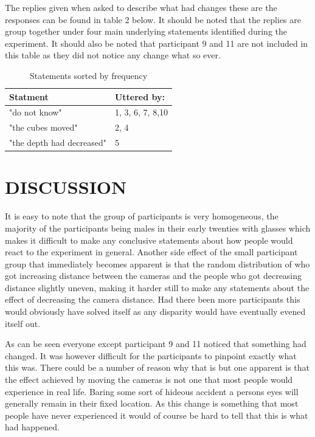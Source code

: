 \documentclass[tog]{acmsiggraph}
\begin{document}
	
		The replies given when asked to describe what had changes these are the responses can be found in table 2 below. It should be noted that the replies are group together under four main underlying statements identified during the experiment. It should also be noted that participant 9 and 11 are not included in this table as they did not notice any change what so ever.
		
	\begin{table}[H]
		\centering
		\caption{Statements sorted by frequency}
		\label{Answers}
		\begin{tabular}{@{}ll@{}}
		\toprule
		Statment                  & Uttered by:      \\ \midrule
		"do not know"             & 1, 3, 6, 7, 8,10 \\
		"the cubes moved"         & 2, 4             \\
		"the depth had decreased" & 5                \\ \bottomrule
	\end{tabular}
\end{table}
		
		
	

\section{DISCUSSION}
It is easy to note that the group of participants is very homogeneous, the majority of the participants being males in their early twenties  with glasses which makes it difficult to make any conclusive statements about how people would react to the experiment in general. Another side effect of the small participant group that immediately becomes apparent is that the random distribution of who got increasing distance between the cameras and the people who got decreasing distance slightly uneven, making it harder still to make any statements about the effect of decreasing the camera distance. Had there been more participants this would obviously have solved itself as any disparity would have eventually evened itself out. 

As can be seen everyone except participant 9 and 11 noticed that something had changed. It was however difficult for the participants to pinpoint exactly what this was. There could be a number of reason why that is but one apparent is that the effect achieved by moving the cameras is not one that most people would experience in real life. Baring some sort of hideous accident a persons eyes will generally remain in their fixed location. As this change is something that most people have never experienced it would of course be hard to tell that this is what had happened. 
\end{document}
